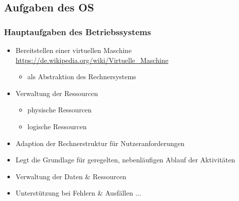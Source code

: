 \documentclass[xcolor=dvipsnames,aspectratio=169]{beamer}
\begin{document}
\subsection{Aufgaben des OS}
\begin{frame}
	\frametitle{Hauptaufgaben des Betriebssystems}
	\begin{itemize}
		\item Bereitstellen einer virtuellen Maschine \url{https://de.wikipedia.org/wiki/Virtuelle_Maschine}
		\begin{itemize}
			\item als Abstraktion des Rechnersystems
		\end{itemize}
		\item Verwaltung der Ressourcen
		\begin{itemize}
			\item physische Ressourcen
			\item logische Ressourcen
		\end{itemize}
		\item Adaption der Rechnerstruktur für Nutzeranforderungen
		\item Legt die Grundlage für geregelten, nebenläufigen Ablauf der Aktivitäten
		\item Verwaltung der Daten \& Ressourcen
		\item Unterstützung bei Fehlern \& Ausfällen ...
	\end{itemize}
\end{frame}
\end{document}
